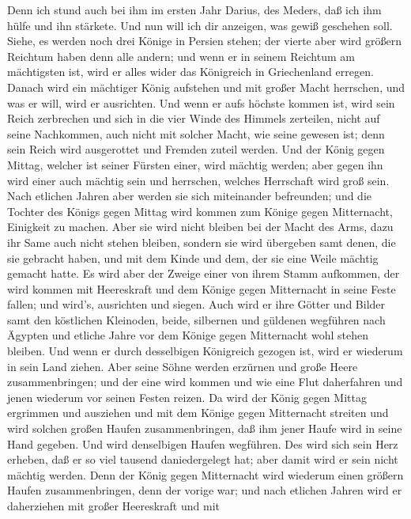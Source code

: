  Denn ich stund auch bei ihm im ersten Jahr Darius, des
Meders, daß ich ihm hülfe und ihn stärkete.  Und nun will
ich dir anzeigen, was gewiß geschehen soll. Siehe, es werden noch drei
Könige in Persien stehen; der vierte aber wird größern Reichtum haben
denn alle andern; und wenn er in seinem Reichtum am mächtigsten ist,
wird er alles wider das Königreich in Griechenland erregen. 
Danach wird ein mächtiger König aufstehen und mit großer Macht
herrschen, und was er will, wird er ausrichten.  Und wenn er
aufs höchste kommen ist, wird sein Reich zerbrechen und sich in die vier
Winde des Himmels zerteilen, nicht auf seine Nachkommen, auch nicht mit
solcher Macht, wie seine gewesen ist; denn sein Reich wird ausgerottet
und Fremden zuteil werden.  Und der König gegen Mittag,
welcher ist seiner Fürsten einer, wird mächtig werden; aber gegen ihn
wird einer auch mächtig sein und herrschen, welches Herrschaft wird groß
sein.  Nach etlichen Jahren aber werden sie sich miteinander
befreunden; und die Tochter des Königs gegen Mittag wird kommen zum
Könige gegen Mitternacht, Einigkeit zu machen. Aber sie wird nicht
bleiben bei der Macht des Arms, dazu ihr Same auch nicht stehen bleiben,
sondern sie wird übergeben samt denen, die sie gebracht haben, und mit
dem Kinde und dem, der sie eine Weile mächtig gemacht hatte.
 Es wird aber der Zweige einer von ihrem Stamm aufkommen,
der wird kommen mit Heereskraft und dem Könige gegen Mitternacht in
seine Feste fallen; und wird's, ausrichten und siegen.  Auch
wird er ihre Götter und Bilder samt den köstlichen Kleinoden, beide,
silbernen und güldenen wegführen nach Ägypten und etliche Jahre vor dem
Könige gegen Mitternacht wohl stehen bleiben.  Und wenn er
durch desselbigen Königreich gezogen ist, wird er wiederum in sein Land
ziehen.  Aber seine Söhne werden erzürnen und große Heere
zusammenbringen; und der eine wird kommen und wie eine Flut daherfahren
und jenen wiederum vor seinen Festen reizen.  Da wird der
König gegen Mittag ergrimmen und ausziehen und mit dem Könige gegen
Mitternacht streiten und wird solchen großen Haufen zusammenbringen, daß
ihm jener Haufe wird in seine Hand gegeben.  Und wird
denselbigen Haufen wegführen. Des wird sich sein Herz erheben, daß er so
viel tausend daniedergelegt hat; aber damit wird er sein nicht mächtig
werden.  Denn der König gegen Mitternacht wird wiederum
einen größern Haufen zusammenbringen, denn der vorige war; und nach
etlichen Jahren wird er daherziehen mit großer Heereskraft und mit
